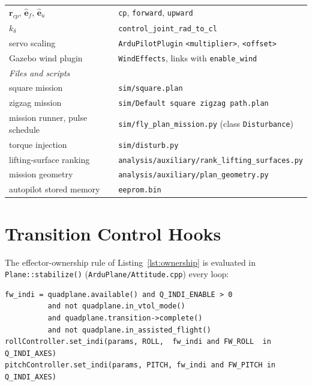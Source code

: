 \documentclass{article}
\begin{document}
\begin{longtable}{p{}p{}}
$\mathbf{r}_{cp}$, $\hat{\mathbf{e}}_f$, $\hat{\mathbf{e}}_u$ & \texttt{cp}, \texttt{forward}, \texttt{upward} \\
$k_\delta$ & \texttt{control\_joint\_rad\_to\_cl} \\
servo scaling & \texttt{ArduPilotPlugin} \texttt{<multiplier>}, \texttt{<offset>} \\
Gazebo wind plugin & \texttt{WindEffects}, links with \texttt{enable\_wind} \\
\midrule
\multicolumn{2}{l}{\emph{Files and scripts}} \\
square mission & \texttt{sim/square.plan} \\
zigzag mission & \texttt{sim/Default square zigzag path.plan} \\
mission runner, pulse schedule & \texttt{sim/fly\_plan\_mission.py} (class \texttt{Disturbance}) \\
torque injection & \texttt{sim/disturb.py} \\
lifting-surface ranking & \texttt{analysis/auxiliary/rank\_lifting\_surfaces.py} \\
mission geometry & \texttt{analysis/auxiliary/plan\_geometry.py} \\
autopilot stored memory & \texttt{eeprom.bin} \\
\end{longtable}

\section{Transition Control Hooks}
\label{sec:appendix-transition-hooks}
The effector-ownership rule of Listing~\ref{lst:ownership} is evaluated in \texttt{Plane::stabilize()} (\texttt{ArduPlane/Attitude.cpp}) every loop:

\begin{lstlisting}[style=pseudostyle, caption={Surface INDI permission, as in \texttt{Plane::stabilize()}.}, label={lst:fw-indi-gate}]
fw_indi = quadplane.available() and Q_INDI_ENABLE > 0
          and not quadplane.in_vtol_mode()
          and quadplane.transition->complete()
          and not quadplane.in_assisted_flight()
rollController.set_indi(params, ROLL,  fw_indi and FW_ROLL  in Q_INDI_AXES)
pitchController.set_indi(params, PITCH, fw_indi and FW_PITCH in Q_INDI_AXES)
\end{lstlisting}
\end{document}

